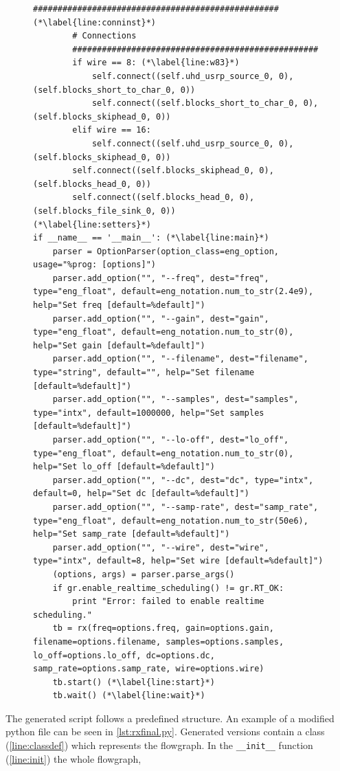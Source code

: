 \documentclass[12pt,a4paper,parskip=full]{scrartcl}
\begin{document}
\begin{figure}[htbp]
\begin{lstlisting}[basicstyle=\tiny,caption={Generated RX flowgraph module with modifications ({\ttfamily rx\_final.py)}},label=lst:rxfinal.py]
        ################################################## (*\label{line:conninst}*)
        # Connections
        ##################################################
        if wire == 8: (*\label{line:w83}*)
            self.connect((self.uhd_usrp_source_0, 0), (self.blocks_short_to_char_0, 0))
            self.connect((self.blocks_short_to_char_0, 0), (self.blocks_skiphead_0, 0))
        elif wire == 16:
            self.connect((self.uhd_usrp_source_0, 0), (self.blocks_skiphead_0, 0))
        self.connect((self.blocks_skiphead_0, 0), (self.blocks_head_0, 0))
        self.connect((self.blocks_head_0, 0), (self.blocks_file_sink_0, 0))
(*\label{line:setters}*)
if __name__ == '__main__': (*\label{line:main}*)
    parser = OptionParser(option_class=eng_option, usage="%prog: [options]")
    parser.add_option("", "--freq", dest="freq", type="eng_float", default=eng_notation.num_to_str(2.4e9), help="Set freq [default=%default]")
    parser.add_option("", "--gain", dest="gain", type="eng_float", default=eng_notation.num_to_str(0), help="Set gain [default=%default]")
    parser.add_option("", "--filename", dest="filename", type="string", default="", help="Set filename [default=%default]")
    parser.add_option("", "--samples", dest="samples", type="intx", default=1000000, help="Set samples [default=%default]")
    parser.add_option("", "--lo-off", dest="lo_off", type="eng_float", default=eng_notation.num_to_str(0), help="Set lo_off [default=%default]")
    parser.add_option("", "--dc", dest="dc", type="intx", default=0, help="Set dc [default=%default]")
    parser.add_option("", "--samp-rate", dest="samp_rate", type="eng_float", default=eng_notation.num_to_str(50e6), help="Set samp_rate [default=%default]")
    parser.add_option("", "--wire", dest="wire", type="intx", default=8, help="Set wire [default=%default]")
    (options, args) = parser.parse_args()
    if gr.enable_realtime_scheduling() != gr.RT_OK:
        print "Error: failed to enable realtime scheduling."
    tb = rx(freq=options.freq, gain=options.gain, filename=options.filename, samples=options.samples, lo_off=options.lo_off, dc=options.dc, samp_rate=options.samp_rate, wire=options.wire)
    tb.start() (*\label{line:start}*)
    tb.wait() (*\label{line:wait}*)
    \end{lstlisting}
\end{figure}
The generated script follows a predefined structure. An example of a modified python
file can be seen in \cref{lst:rxfinal.py}. Generated versions contain a class
(\cref{line:classdef}) which represents the flowgraph. In the
\lstinline{__init__} function (\cref{line:init}) the whole flowgraph,
\end{document}
